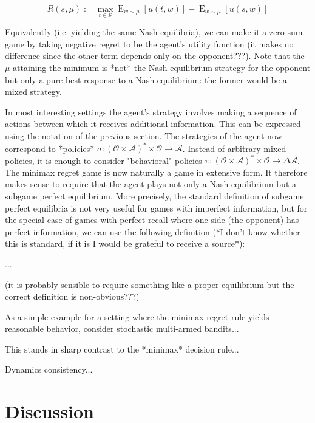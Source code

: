 \documentclass[a4paper]{article}
\DeclareMathOperator{\E}{E}
\newcommand{\SP}[1]{\Delta #1}
\newcommand{\Act}{\mathcal{A}}
\newcommand{\Per}{\mathcal{O}}
\newcommand{\His}{(\Per \times \Act)^*}
\newcommand{\Strat}{\mathcal{S}}
\begin{document}
$${R(s,\mu):=\max_{t \in \Strat} \E_{w \sim \mu}[u(t,w)]} - \E_{w \sim \mu}[u(s,w)]$$

Equivalently (i.e. yielding the same Nash equilibria), we can make it a zero-sum game by taking negative regret to be the agent's utility function (it makes no difference since the other term depends only on the opponent???). Note that the ${\mu}$ attaining the minimum is *not* the Nash equilibrium strategy for the opponent but only a pure best response to a Nash equilibrium: the former would be a mixed strategy.

In most interesting settings the agent's strategy involves making a sequence of actions between which it receives additional information. This can be expressed using the notation of the previous section. The strategies of the agent now correspond to *policies* ${\sigma: \His \times \Per \rightarrow \Act}$. Instead of arbitrary mixed policies, it is enough to consider "behavioral" policies ${\pi: \His \times \Per \rightarrow \SP{\Act}}$. The minimax regret game is now naturally a game in extensive form. It therefore makes sense to require that the agent plays not only a Nash equilibrium but a subgame perfect equilibrium. More precisely, the standard definition of subgame perfect equilibria is not very useful for games with imperfect information, but for the special case of games with perfect recall where one side (the opponent) has perfect information, we can use the following definition (*I don't know whether this is standard, if it is I would be grateful to receive a source*):

... 

(it is probably sensible to require something like a proper equilibrium but the correct definition is non-obvious???)

As a simple example for a setting where the minimax regret rule yields reasonable behavior, consider stochastic multi-armed bandits...

This stands in sharp contrast to the *minimax* decision rule...

Dynamics consistency...

\section{Discussion}
\end{document}
